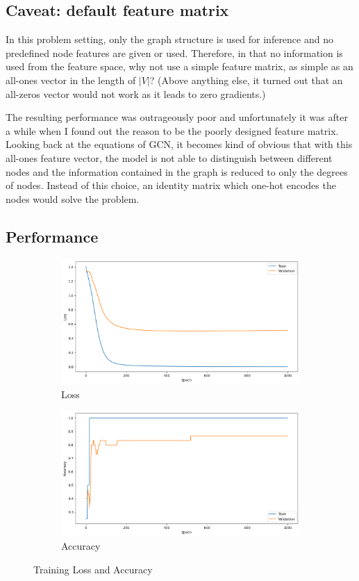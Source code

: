 \documentclass{article}
\begin{document}
\subsection*{Caveat: default feature matrix}
In this problem setting, only the graph structure is used for inference and no predefined node features are given or used. Therefore, in that no information is used from the feature space, why not use a simple feature matrix, as simple as an all-ones vector in the length of $|V|$? (Above anything else, it turned out that an all-zeros vector would not work as it leads to zero gradients.)

The resulting performance was outrageously poor and unfortunately it was after a while when I found out the reason to be the poorly designed feature matrix. Looking back at the equations of GCN, it becomes kind of obvious that with this all-ones feature vector, the model is not able to distinguish between different nodes and the information contained in the graph is reduced to only the degrees of nodes. Instead of this choice, an identity matrix which one-hot encodes the nodes would solve the problem.

\subsection*{Performance}
\begin{figure}[h]
  \centering
  \begin{subfigure}{0.45\textwidth}
    \includegraphics[width=\textwidth]{loss.png}
    \caption{Loss}
  \end{subfigure}
  \begin{subfigure}{0.45\textwidth}
    \includegraphics[width=\textwidth]{acc}
    \caption{Accuracy}
  \end{subfigure}
  \caption{Training Loss and Accuracy}
  \label{fig:perf}
\end{figure}
\end{document}
